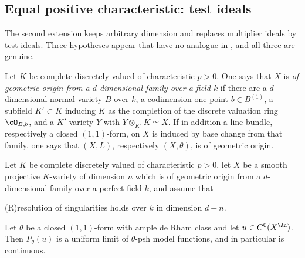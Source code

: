 \subsection{Equal positive characteristic: test ideals}
\label{sec:ch23-later-test-ideals}

The second extension keeps arbitrary dimension and replaces multiplier
ideals by test ideals.  Three hypotheses appear that have no analogue in
, and all three are genuine.

\begin{definition}
\label{def:ch23-geometric-origin}
Let \(K\) be complete discretely valued of characteristic \(p>0\).  One says
that \(X\) is \emph{of geometric origin from a \(d\)-dimensional family over
a field \(k\)} if there are a \(d\)-dimensional normal variety \(B\) over
\(k\), a codimension-one point \(b\in B^{(1)}\), a subfield
\(K'\subset K\) inducing \(K\) as the completion of the discrete valuation
ring \(\cO_{B,b}\), and a \(K'\)-variety \(Y\) with
\(Y\otimes_{K'}K\simeq X\).  If in addition a line bundle, respectively a
closed \((1,1)\)-form, on \(X\) is induced by base change from that family,
one says that \((X,L)\), respectively \((X,\theta)\), is of geometric
origin.
\end{definition}

\begin{theorem}
\label{thm:ch23-gjkm-positive-characteristic}
Let \(K\) be complete discretely valued of characteristic \(p>0\), let \(X\)
be a smooth projective \(K\)-variety of dimension \(n\) which is of
geometric origin from a \(d\)-dimensional family over a perfect field
\(k\), and assume that
\begin{center}
\textup{(R)}\quad resolution of singularities holds over \(k\)
in dimension \(d+n\).
\end{center}
Let \(\theta\) be a closed \((1,1)\)-form with ample de Rham class and let
\(u\in C^0(X^{\An})\).  Then \(P_\theta(u)\) is a uniform limit of
\(\theta\)-psh model functions, and in particular is continuous.
\end{theorem}


